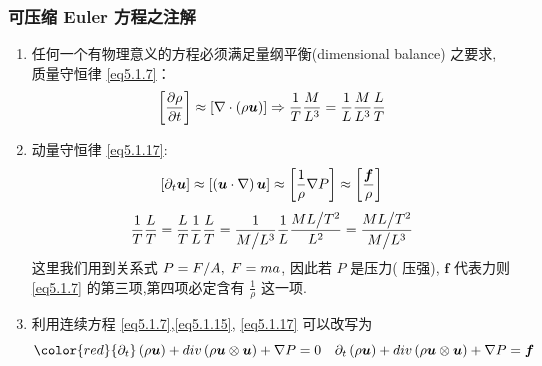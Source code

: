 \documentclass[aspectratio=2516]{beamer}
\begin{document}
\begin{frame}
\frametitle{\kaishu 可压缩 Euler 方程之注解}

\kaishu 

\small 

\begin{enumerate}
	\item \small  任何一个有物理意义的方程必须满足量纲平衡(dimensional balance) 之要求, 质量守恒律 \ref{eq5.1.7}：
	\begin{equation}
	\left[ {\frac{{\partial \rho }}{{\partial t}}} \right] \approx \left[ {\nabla  \cdot \left( {\rho {\boldsymbol{u}}} \right)} \right] \Rightarrow \frac{1}{T}\frac{M}{{{L^3}}} = \frac{1}{L}\frac{M}{{{L^3}}}\frac{L}{T}
	\notag 
	\end{equation}
	\item \small 动量守恒律 \ref{eq5.1.17}:
	\begin{equation}
	\left[ {{\partial _t}\boldsymbol{u}} \right] \approx \left[ {\left( {\boldsymbol{u} \cdot \nabla } \right)\boldsymbol{u}} \right] \approx \left[ {\frac{1}{\rho }\nabla P} \right] \approx \left[ {\frac{\boldsymbol{f}}{\rho }} \right]
	\notag 
	\end{equation}
	\begin{equation}
	\frac{1}{T}\frac{L}{T} = \frac{L}{T}\frac{1}{L}\frac{L}{T} = \frac{1}{{{M \mathord{\left/
					{\vphantom {M {{L^3}}}} \right.
					\kern-\nulldelimiterspace} {{L^3}}}}}\frac{1}{L}\frac{{{{ML} \mathord{\left/
					{\vphantom {{ML} {{T^2}}}} \right.
					\kern-\nulldelimiterspace} {{T^2}}}}}{{{L^2}}} = \frac{{{{ML} \mathord{\left/
					{\vphantom {{ML} {{T^2}}}} \right.
					\kern-\nulldelimiterspace} {{T^2}}}}}{{{M \mathord{\left/
					{\vphantom {M {{L^3}}}} \right.
					\kern-\nulldelimiterspace} {{L^3}}}}}
	\notag 
	\end{equation}
	这里我们用到关系式 $P = {F \mathord{\left/
			{\vphantom {F A}} \right.
			\kern-\nulldelimiterspace} A},\;F = ma$, 因此若 $ P $ 是压力({\color{red} 压强}),  $ \boldsymbol{f} $ 代表力则 \ref{eq5.1.7} 的第三项,第四项必定含有 $\frac{1}{\rho }$ 这一项.
	\item \small 利用连续方程 \ref{eq5.1.7},\ref{eq5.1.15}, \ref{eq5.1.17} 可以改写为
	\begin{equation}
	\color{red}
	{\partial _t}\left( {\rho \boldsymbol{u}} \right) + div\left( {\rho \boldsymbol{u} \otimes \boldsymbol{u}} \right) + \nabla P = 0 \quad  {\partial _t}\left( {\rho \boldsymbol{u}} \right) + div\left( {\rho \boldsymbol{u} \otimes \boldsymbol{u}} \right) + \nabla P = \boldsymbol{f}
	\notag 
	\end{equation}
	
\end{enumerate}

\end{frame}
\end{document}
